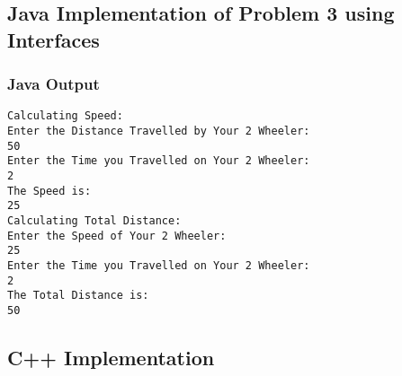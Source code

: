 \documentclass[11pt]{article}
\begin{document}
\subsection{Java Implementation of Problem 3 using Interfaces}






\subsubsection{Java Output}
\begin{lstlisting}[caption=Java Output for Program 3]
Calculating Speed:
Enter the Distance Travelled by Your 2 Wheeler:
50
Enter the Time you Travelled on Your 2 Wheeler:
2
The Speed is:
25
Calculating Total Distance:
Enter the Speed of Your 2 Wheeler:
25
Enter the Time you Travelled on Your 2 Wheeler:
2
The Total Distance is:
50
\end{lstlisting}

\subsection{C++ Implementation}


\end{document}
